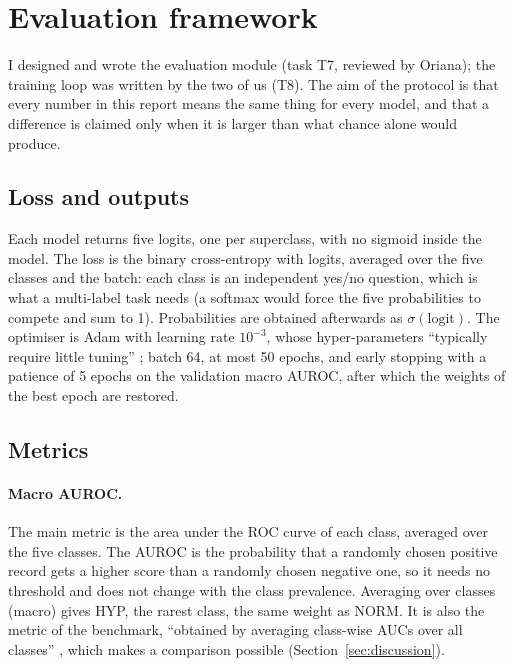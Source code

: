 \section{Evaluation framework}\label{sec:evaluation}

I designed and wrote the evaluation module (task T7, reviewed by Oriana); the training loop was written
by the two of us (T8). The aim of the protocol is that every number in this report means the same thing
for every model, and that a difference is claimed only when it is larger than what chance alone would
produce.

\subsection{Loss and outputs}

Each model returns five logits, one per superclass, with no sigmoid inside the model. The loss is the
binary cross-entropy with logits, averaged over the five classes and the batch: each class is an
independent yes/no question, which is what a multi-label task needs (a softmax would force the five
probabilities to compete and sum to 1). Probabilities are obtained afterwards as
$\sigma(\text{logit})$. The optimiser is Adam with learning rate $10^{-3}$, whose hyper-parameters
``typically require little tuning'' \cite[p.~1]{kingma2015adam}; batch 64, at most 50 epochs, and early
stopping with a patience of 5 epochs on the validation macro AUROC, after which the weights of the best
epoch are restored.

\subsection{Metrics}

\paragraph{Macro AUROC.} The main metric is the area under the ROC curve of each class, averaged over the
five classes. The AUROC is the probability that a randomly chosen positive record gets a higher score than
a randomly chosen negative one, so it needs no threshold and does not change with the class prevalence.
Averaging over classes (macro) gives HYP, the rarest class, the same weight as NORM. It is also the
metric of the benchmark, ``obtained by averaging class-wise AUCs over all classes''
\cite[p.~1522]{strodthoff2021deep}, which makes a comparison possible (Section~\ref{sec:discussion}).

